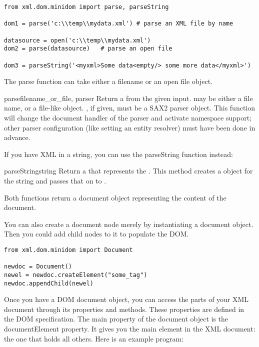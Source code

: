 \begin{verbatim}
from xml.dom.minidom import parse, parseString

dom1 = parse('c:\\temp\\mydata.xml') # parse an XML file by name

datasource = open('c:\\temp\\mydata.xml')
dom2 = parse(datasource)   # parse an open file

dom3 = parseString('<myxml>Some data<empty/> some more data</myxml>')
\end{verbatim}

The parse function can take either a filename or an open file object. 

\begin{funcdesc}{parse}{filename_or_file{, parser}}
  Return a  from the given input. 
  may be either a file name, or a file-like object. , if
  given, must be a SAX2 parser object. This function will change the
  document handler of the parser and activate namespace support; other
  parser configuration (like setting an entity resolver) must have been
  done in advance.
\end{funcdesc}

If you have XML in a string, you can use the parseString function
instead:

\begin{funcdesc}{parseString}{string}
  Return a  that represents the . This
  method creates a  object for the string and passes
  that on to .
\end{funcdesc}

Both functions return a document object representing the content of
the document.

You can also create a document node merely by instantiating a 
document object. Then you could add child nodes to it to populate
the DOM.

\begin{verbatim}
from xml.dom.minidom import Document

newdoc = Document()
newel = newdoc.createElement("some_tag")
newdoc.appendChild(newel)
\end{verbatim}

Once you have a DOM document object, you can access the parts of your
XML document through its properties and methods.  These properties are
defined in the DOM specification.  The main property of the document
object is the documentElement property.  It gives you the main element
in the XML document: the one that holds all others.  Here is an
example program:

